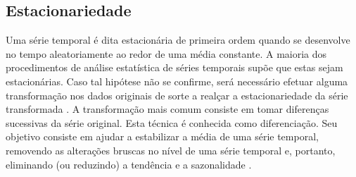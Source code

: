  \subsection{Estacionariedade}
 
 Uma série temporal é dita estacionária de primeira ordem quando se desenvolve no tempo 
     aleatoriamente ao redor de uma média constante. A maioria dos procedimentos de análise 
     estatística de séries temporais supõe que estas sejam estacionárias. Caso tal hipótese não 
     se confirme, será necessário efetuar alguma transformação nos dados originais de sorte a 
     realçar a estacionariedade da série transformada \cite{grenander1957statistical}.
 A transformação mais comum consiste em tomar diferenças sucessivas da série original. Esta 
     técnica é conhecida como diferenciação. Seu objetivo consiste em ajudar a estabilizar a 
     média de uma série temporal, removendo as alterações bruscas no nível de uma série 
     temporal e, portanto, eliminando (ou reduzindo) a tendência e a sazonalidade 
     \cite{morettin2006analise, hyndman2018forecasting}.
